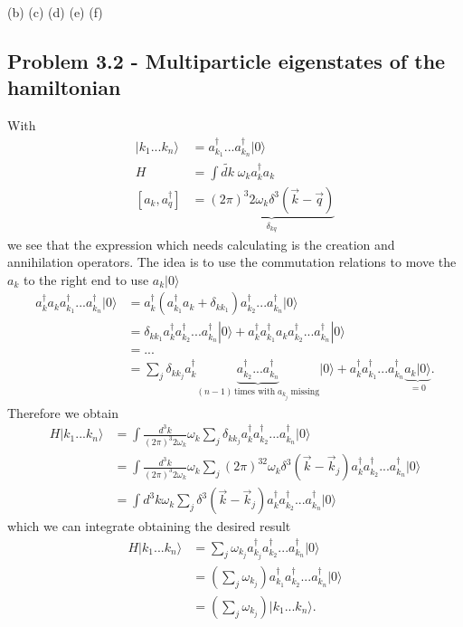 \documentclass[../main.tex]{subfiles}
\begin{document}
(b)
(c)
(d)
(e)
(f)

\subsection{Problem 3.2 - Multiparticle eigenstates of the hamiltonian}
With
\begin{align}
|k_1...k_n\rangle&=a^\dagger_{k_1}...a^\dagger_{k_n}|0\rangle\\
H&=\int\widetilde{dk}\;\omega_k a^\dagger_ka_k\\
[a_k,a_q^\dagger]&=\underbrace{(2\pi)^3 2\omega_k\delta^3(\vec{k}-\vec{q})}_{\delta_{kq}}
\end{align}
we see that the expression which needs calculating is the creation and annihilation operators. The idea is to use the commutation relations to move the $a_k$ to the right end to use $a_k|0\rangle$
\begin{align}
a^\dagger_ka_ka^\dagger_{k_1}...a^\dagger_{k_n}|0\rangle
&=a^\dagger_k(a^\dagger_{k_1}a_k+\delta_{kk_1})a^\dagger_{k_2}...a^\dagger_{k_n}|0\rangle\\
&=\delta_{kk_1}a^\dagger_ka^\dagger_{k_2}...a^\dagger_{k_n}|0\rangle
+a^\dagger_ka^\dagger_{k_1}a_ka^\dagger_{k_2}...a^\dagger_{k_n}|0\rangle\\
&=...\\
&=\sum_j\delta_{kk_j}a^\dagger_k\underbrace{a^\dagger_{k_2}...a^\dagger_{k_n}}_{(n-1)\, \text{times with}\;a_{k_j}\;\text{missing}}|0\rangle+a^\dagger_ka^\dagger_{k_1}...a^\dagger_{k_n}\underbrace{a_k|0\rangle}_{=0}.
\end{align}
Therefore we obtain
\begin{align}
H|k_1...k_n\rangle
&=\int\frac{d^3k}{(2\pi)^3 2\omega_k}\omega_k\sum_j\delta_{kk_j}a^\dagger_ka^\dagger_{k_2}...a^\dagger_{k_n}|0\rangle\\
&=\int\frac{d^3k}{(2\pi)^3 2\omega_k}\omega_k\sum_j(2\pi)^32\omega_k\delta^3(\vec{k}-\vec{k}_j)a^\dagger_ka^\dagger_{k_2}...a^\dagger_{k_n}|0\rangle\\
&=\int d^3k\omega_k\sum_j\delta^3(\vec{k}-\vec{k}_j)a^\dagger_ka^\dagger_{k_2}...a^\dagger_{k_n}|0\rangle
\end{align}
which we can integrate obtaining the desired result
\begin{align}
H|k_1...k_n\rangle
&=\sum_j\omega_{k_j}a^\dagger_{k_j}a^\dagger_{k_2}...a^\dagger_{k_n}|0\rangle\\
&=\left(\sum_j\omega_{k_j}\right)a^\dagger_{k_1}a^\dagger_{k_2}...a^\dagger_{k_n}|0\rangle\\
&=\left(\sum_j\omega_{k_j}\right)|k_1...k_n\rangle.
\end{align}
\end{document}
